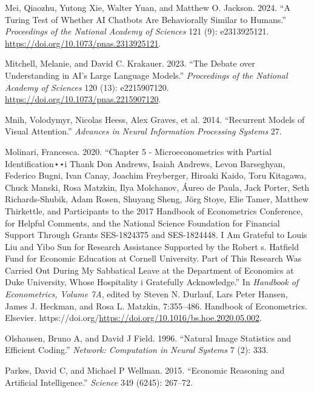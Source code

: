 \documentclass[
]{article}
\newlength{\cslhangindent}
\newenvironment{CSLReferences}[2] %
 {\begin{list}{}{%
  \setlength{\itemindent}{0pt}
  \setlength{\leftmargin}{0pt}
  \setlength{\parsep}{0pt}
  \ifodd #1
   \setlength{\leftmargin}{\cslhangindent}
   \setlength{\itemindent}{-1\cslhangindent}
  \fi
  \setlength{\itemsep}{#2\baselineskip}}}
 {\end{list}}
\begin{document}
\begin{CSLReferences}{1}{0}
Mei, Qiaozhu, Yutong Xie, Walter Yuan, and Matthew O. Jackson. 2024.
{``A Turing Test of Whether AI Chatbots Are Behaviorally Similar to
Humans.''} \emph{Proceedings of the National Academy of Sciences} 121
(9): e2313925121. \url{https://doi.org/10.1073/pnas.2313925121}.

Mitchell, Melanie, and David C. Krakauer. 2023. {``The Debate over
Understanding in AI's Large Language Models.''} \emph{Proceedings of the
National Academy of Sciences} 120 (13): e2215907120.
\url{https://doi.org/10.1073/pnas.2215907120}.

Mnih, Volodymyr, Nicolas Heess, Alex Graves, et al. 2014. {``Recurrent
Models of Visual Attention.''} \emph{Advances in Neural Information
Processing Systems} 27.

Molinari, Francesca. 2020. {``Chapter 5 - Microeconometrics with Partial
Identification⋆⋆i Thank Don Andrews, Isaiah Andrews, Levon Barseghyan,
Federico Bugni, Ivan Canay, Joachim Freyberger, Hiroaki Kaido, Toru
Kitagawa, Chuck Manski, Rosa Matzkin, Ilya Molchanov, Áureo de Paula,
Jack Porter, Seth Richards-Shubik, Adam Rosen, Shuyang Sheng, Jörg
Stoye, Elie Tamer, Matthew Thirkettle, and Participants to the 2017
Handbook of Econometrics Conference, for Helpful Comments, and the
National Science Foundation for Financial Support Through Grants
SES-1824375 and SES-1824448. I Am Grateful to Louis Liu and Yibo Sun for
Research Assistance Supported by the Robert s. Hatfield Fund for
Economic Education at Cornell University. Part of This Research Was
Carried Out During My Sabbatical Leave at the Department of Economics at
Duke University, Whose Hospitality i Gratefully Acknowledge.''} In
\emph{Handbook of Econometrics, Volume 7A}, edited by Steven N. Durlauf,
Lars Peter Hansen, James J. Heckman, and Rosa L. Matzkin, 7:355--486.
Handbook of Econometrics. Elsevier.
https://doi.org/\url{https://doi.org/10.1016/bs.hoe.2020.05.002}.

Olshausen, Bruno A, and David J Field. 1996. {``Natural Image Statistics
and Efficient Coding.''} \emph{Network: Computation in Neural Systems} 7
(2): 333.

Parkes, David C, and Michael P Wellman. 2015. {``Economic Reasoning and
Artificial Intelligence.''} \emph{Science} 349 (6245): 267--72.


\end{CSLReferences}
\end{document}
